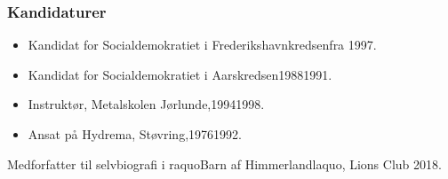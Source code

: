 \documentclass[11pt, a4paper]{awesome-cv}
\begin{document}
\begin{cvletter}
\subsubsection*{Kandidaturer}
\begin{itemize}
\item Kandidat for Socialdemokratiet i Frederikshavnkredsenfra 1997.
\item Kandidat for Socialdemokratiet i Aarskredsen19881991.
\end{itemize}
\begin{itemize}
\item Instruktør, Metalskolen Jørlunde,19941998.
\item Ansat på Hydrema, Støvring,19761992.
\end{itemize}
Medforfatter til selvbiografi i raquoBarn af Himmerlandlaquo, Lions Club 2018.

\end{cvletter}
\end{document}

